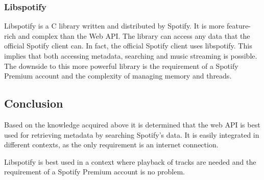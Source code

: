 \subsubsection{Libspotify}
\label{music_catalog_libspotify}

Libspotify is a C library written and distributed by Spotify. It is more feature-rich and complex than the Web API. The library can access any data that the official Spotify client can. In fact, the official Spotify client uses libspotify. This implies that both accessing metadata, searching and music streaming is possible. The downside to this more powerful library is the requirement of a Spotify Premium account and the complexity of managing memory and threads.

\subsection{Conclusion}
\label{ssub:music_catalog_conclusion}

Based on the knowledge acquired above it is determined that the web API is best used for retrieving metadata by searching Spotify's data. It is easily integrated in different contexts, as the only requirement is an internet connection.

Libspotify is best used in a context where playback of tracks are needed and the requirement of a Spotify Premium account is no problem.
